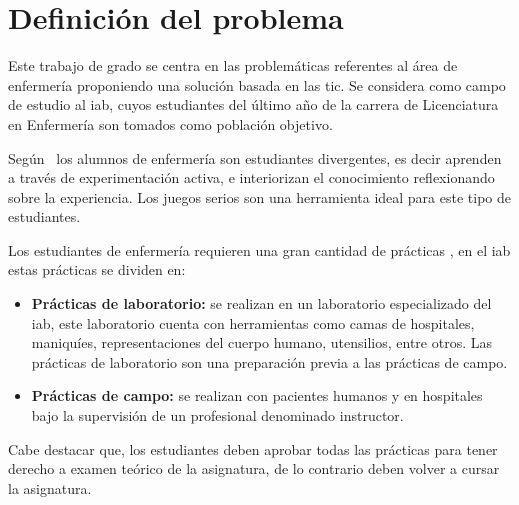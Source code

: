 \section{Definición del problema}

Este trabajo de grado se centra en las problemáticas referentes al área de
enfermería proponiendo una solución basada en las \gls{tic}. Se considera como
campo de estudio al \gls{iab}, cuyos estudiantes del último año de la carrera de
Licenciatura en Enfermería son tomados como población objetivo.


Según~\cite{humphreys2013developing} los alumnos de enfermería son estudiantes
divergentes, es decir aprenden a través de experimentación activa, e
interiorizan el conocimiento reflexionando sobre la experiencia. Los juegos
serios son una herramienta ideal para este tipo de
estudiantes\cite{humphreys2013developing}. 

Los estudiantes de enfermería requieren una gran cantidad de prácticas , en el
\Gls{iab} estas prácticas se dividen en:
\begin{itemize}
\item \textbf{Prácticas de laboratorio:} se realizan en un laboratorio
    especializado del \Gls{iab}, este laboratorio cuenta con herramientas como
    camas de hospitales, maniquíes, representaciones del cuerpo humano,
    utensilios, entre otros. Las prácticas de laboratorio son una
    preparación previa a las prácticas de campo.
\item \textbf{Prácticas de campo:} se realizan con pacientes humanos y en
    hospitales bajo la supervisión de un profesional denominado instructor. 
\end{itemize}

Cabe destacar que, los estudiantes deben aprobar todas las prácticas para tener 
derecho a examen teórico de la asignatura, de lo contrario deben volver a cursar la 
asignatura.


